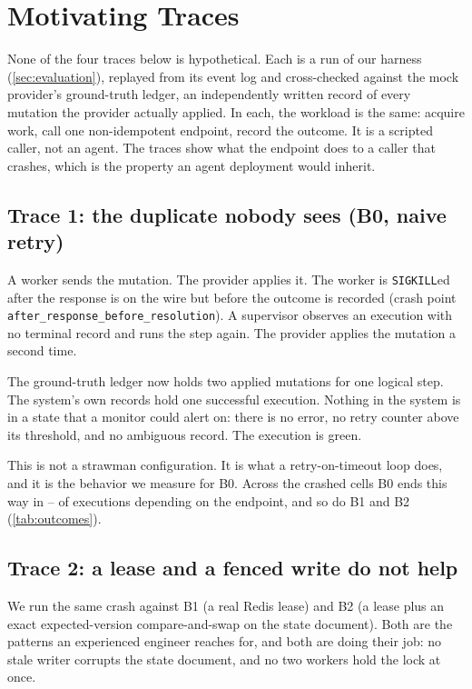 \section{Motivating Traces}
\label{sec:motivating}

None of the four traces below is hypothetical. Each is a run of our harness
(\cref{sec:evaluation}), replayed from its event log and cross-checked against
the mock provider's ground-truth ledger, an independently written record of
every mutation the provider actually applied. In each, the
workload is the same: acquire work, call one non-idempotent endpoint, record
the outcome. It is a scripted caller, not an agent. The traces show what
the endpoint does to a caller that crashes, which is the property an agent
deployment would inherit.

\subsection{Trace 1: the duplicate nobody sees (B0, naive retry)}

A worker sends the mutation. The provider applies it. The worker is
\texttt{SIGKILL}ed after the response is on the wire but before the outcome is
recorded (crash point \texttt{after\_response\_before\_resolution}). A
supervisor observes an execution with no terminal record and runs the step
again. The provider applies the mutation a second time.

The ground-truth ledger now holds two applied mutations for one logical
step. The system's own records hold one successful execution. Nothing in the
system is in a state that a monitor could alert on: there is no error, no
retry counter above its threshold, and no ambiguous record. The execution is
green.

This is not a strawman configuration. It is what a retry-on-timeout loop does,
and it is the behavior we measure for B0. Across the crashed cells B0 ends
this way in \BaselineDupLow{}--\BaselineDupHigh{} of executions depending on
the endpoint, and so do B1 and B2 (\cref{tab:outcomes}).

\subsection{Trace 2: a lease and a fenced write do not help}

We run the same crash against B1 (a real Redis lease) and B2 (a lease plus an
exact expected-version compare-and-swap on the state document). Both are the
patterns an experienced engineer reaches for, and both are doing their job: no
stale writer corrupts the state document, and no two workers hold the lock at
once.

